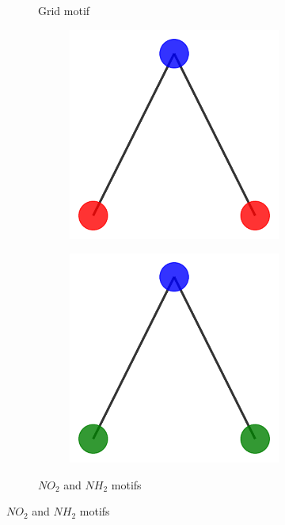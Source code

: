 \begin{figure}[h]
\begin{subfigure}[b]{0.2\textwidth}
        \caption{Grid motif}
        \label{fig:subfig3}
    \end{subfigure}
    \begin{subfigure}[b]{0.30\textwidth}
        \centering
        \begin{subfigure}[b]{0.48\linewidth}
            \includegraphics[width=\linewidth]{img/Motif_Vis/MUTAG-MOTIF1.pdf}
        \end{subfigure}
        \begin{subfigure}[b]{0.48\linewidth}
            \includegraphics[width=\linewidth]{img/Motif_Vis/MUTAG-MOTIF2.pdf}
        \end{subfigure}
        \caption{$NO_2$ and $NH_2$ motifs}
        \label{fig:subfig4}
    \end{subfigure}
    

\end{figure}
